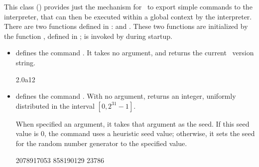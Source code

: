 This class ()
provides just the mechanism for \ns\ to export
simple commands to the interpreter, 
that can then be executed within a global context by the interpreter.
There are two functions defined in :
 and .
These two functions are initialized by the function
,
defined in ;
 is invoked by
during startup.
\begin{itemize}\itemsep0pt
\item {}
  defines the command .
  It takes no argument, and returns the current \ns\ version string.
\begin{program}
            2.0a12
\end{program}

\item {}
  defines the command .
  With no argument,  returns an integer,
  uniformly distributed in the interval $[0, 2^{31}-1]$.

  When specified an argument, it takes that argument as the seed.
  If this seed value is 0, the command uses a heuristic seed value;
  otherwise, it sets the seed for the random number generator to the
  specified value.
\begin{program}
            2078917053
            858190129
            23786
\end{program}
\end{itemize}

